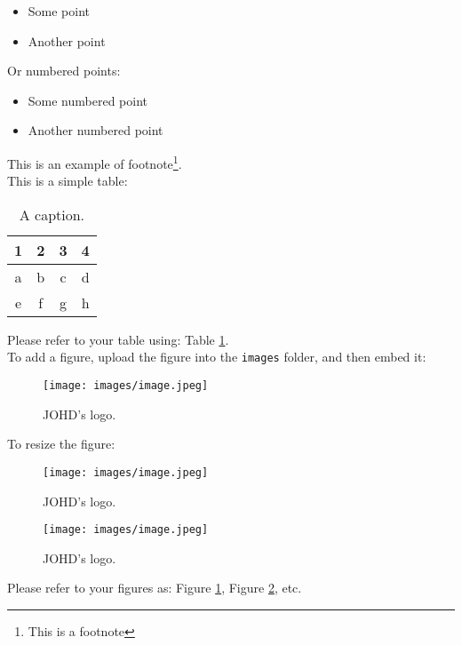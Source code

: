 \documentclass{article}
\begin{document}
\begin{itemize}
    \item Some point
    \item Another point
\end{itemize}

\noindent Or numbered points:

\begin{itemize}
    \item[1.] Some numbered point
    \item[2.] Another numbered point
\end{itemize}

\noindent This is an example of footnote\footnote{This is a footnote}. \\

\noindent This is a simple table:

\begin{table}[H]
\centering
\label{tab1} %
\caption{A caption.}
\begin{tabular}{cccc}
\hline
1 & 2 & 3 & 4 \\
\hline
a & b & c & d\\
e & f & g & h\\
\hline
\end{tabular}
\end{table}

\noindent Please refer to your table using: Table \ref{tab1}.\\

\noindent To add a figure, upload the figure into the \texttt{images} folder, and then embed it:

\begin{figure}[H]
\centering
\texttt{[image: images/image.jpeg]}
\caption{\label{fig1}JOHD's logo.}
\end{figure}

\noindent To resize the figure:

\begin{figure}[H]
\centering
\texttt{[image: images/image.jpeg]}
\caption{\label{fig2}JOHD's logo.}
\end{figure}

\begin{figure}[H]
\centering
\texttt{[image: images/image.jpeg]}
\caption{\label{fig3}JOHD's logo.}
\end{figure}

\noindent Please refer to your figures as: Figure \ref{fig1}, Figure \ref{fig2}, etc.
\end{document}
